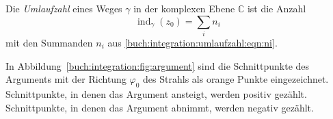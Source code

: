 \begin{definition}[Umlaufzahl]
\label{buch:integration:definition:umlaufzahl}
%
Die \emph{Umlaufzahl} eines Weges $\gamma$ in der komplexen Ebene
$\mathbb{C}$ ist die Anzahl
\[
\operatorname{ind}_\gamma(z_0)
=
\sum_i n_i
\]
mit den Summanden $n_i$ aus
\eqref{buch:integration:umlaufzahl:eqn:ni}.
%
\end{definition}

In Abbildung~\ref{buch:integration:fig:argument} sind die Schnittpunkte
des Arguments mit der Richtung $\varphi_0$ des Strahls als orange
Punkte eingezeichnet.
Schnittpunkte, in denen das Argument ansteigt, werden positiv gezählt.
Schnittpunkte, in denen das Argument abnimmt, werden negativ gezählt.

